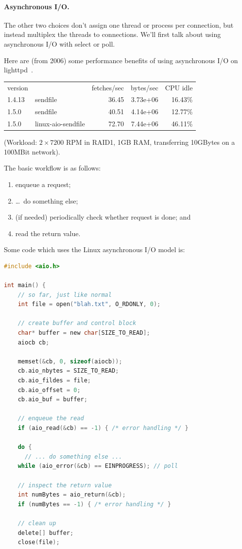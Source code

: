 \documentclass[a4paper]{report}
\begin{document}
\paragraph{Asynchronous I/O.} The other two choices don't assign one thread or process per connection,
but instead multiplex the threads to connections. We'll first talk
about using asynchronous I/O with select or poll.  

Here are (from 2006) some performance benefits of using asynchronous
I/O on lighttpd~\cite{lttpd}.

    \begin{tabular}{llrrr}
    version & & fetches/sec & bytes/sec & CPU idle \\
    1.4.13 & sendfile & 36.45 & 3.73e+06 & 16.43\% \\
    1.5.0 & sendfile & 40.51 & 4.14e+06 & 12.77\% \\
    1.5.0 & linux-aio-sendfile & 72.70 & 7.44e+06 & 46.11\% \\
    \end{tabular}

(Workload: $2\times 7200$ RPM in RAID1, 1GB RAM, transferring 10GBytes on a 100MBit network).

The basic workflow is as follows: 
   \begin{enumerate}
     \item enqueue a request;
     \item \ldots ~do something else;
     \item (if needed) periodically check whether request is done; and
     \item read the return value.
   \end{enumerate}

Some code which uses the Linux asynchronous I/O model is:
\begin{lstlisting}[language=C]
#include <aio.h>

int main() {
    // so far, just like normal
    int file = open("blah.txt", O_RDONLY, 0);

    // create buffer and control block
    char* buffer = new char[SIZE_TO_READ];
    aiocb cb;
    
    memset(&cb, 0, sizeof(aiocb));
    cb.aio_nbytes = SIZE_TO_READ;
    cb.aio_fildes = file;
    cb.aio_offset = 0;
    cb.aio_buf = buffer;

    // enqueue the read
    if (aio_read(&cb) == -1) { /* error handling */ }

    do {
      // ... do something else ...
    while (aio_error(&cb) == EINPROGRESS); // poll

    // inspect the return value
    int numBytes = aio_return(&cb);
    if (numBytes == -1) { /* error handling */ }

    // clean up
    delete[] buffer;
    close(file);
\end{lstlisting}
\end{document}
